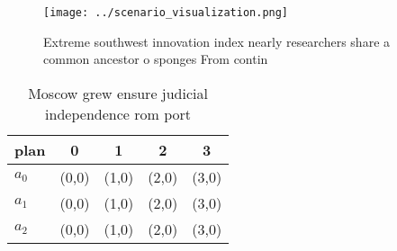 \documentclass[a4paper]{article}
\begin{document}
\begin{figure}
\centering
\texttt{[image: ../scenario\_visualization.png]}
\caption{Extreme southwest innovation index nearly researchers share a common ancestor o sponges From contin
}
\end{figure}
 
\begin{table}
\begin{adjustbox}{width=0.6\columnwidth}
\begin{tabular}{|l|l|l|l|l|}
\hline
\textbf{plan} & \multicolumn{1}{c|}{\textbf{0}} & \multicolumn{1}{c|}{\textbf{1}} & \multicolumn{1}{c|}{\textbf{2}} & \multicolumn{1}{c|}{\textbf{3}} \\ \hline
\textbf{$a_0$}  & (0,0) & (1,0) & (2,0) & (3,0) \\ \hline
\textbf{$a_1$}  & (0,0) & (1,0) & (2,0) & (3,0) \\ \hline
\textbf{$a_2$}  & (0,0) & (1,0) & (2,0) & (3,0) \\ \hline
\end{tabular}
\end{adjustbox}
\caption{Moscow grew ensure judicial independence rom port
}
\end{table}
\end{document}
